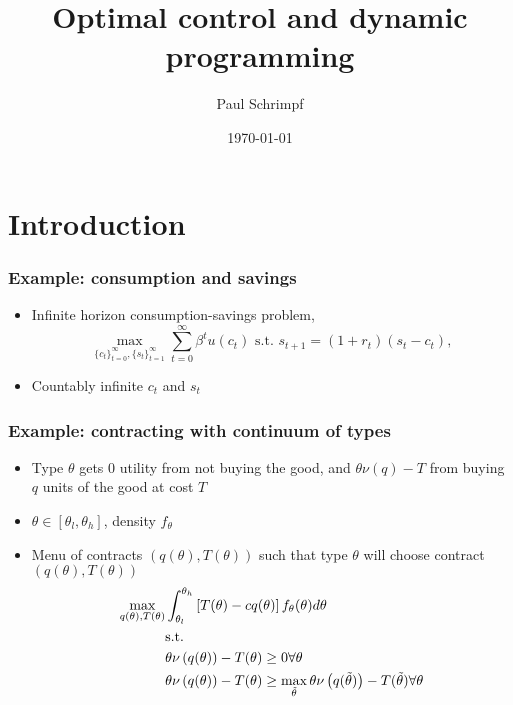 \documentclass[compress]{beamer}
\title{Optimal control and dynamic programming}
\author{Paul Schrimpf}
\institute{UBC \\ Economics 526}
\date{\today}
\begin{document}
\frame{\titlepage}

\begin{frame}
  \tableofcontents  
\end{frame}

\section{Introduction} 

\begin{frame} \frametitle{Example: consumption and savings}
  \begin{itemize}
  \item Infinite horizon consumption-savings problem, 
    \[ \max_{\{c_t\}_{t=0}^\infty,\{s_t\}_{t=1}^\infty} \sum_{t=0}^\infty
    \beta^t u(c_t) \text{ s.t. } s_{t+1} = (1+r_t)(s_t - c_t), \]  
  \item Countably infinite $c_t$ and $s_t$
  \end{itemize} 
\end{frame}

\begin{frame}
  \frametitle{Example: contracting with continuum of types}
  \begin{itemize}
  \item Type $\theta$ gets $0$ utility from not buying the good, and
    $\theta \nu(q) - T$ from buying $q$ units of the good at cost
    $T$
  \item $\theta \in [\theta_l,\theta_h]$, density $f_\theta$
  \item Menu of contracts $(q(\theta),T(\theta))$ such that type $\theta$ will
    choose contract $(q(\theta),T(\theta))$
    \begin{align}
      \max_{q(\theta),T(\theta)} & \int_{\theta_l}^{\theta_h} 
      \left[T(\theta) - cq(\theta)\right]
      f_\theta(\theta) d\theta \notag \\
      & \text{s.t.} \notag \\
      &\theta \nu\left(q(\theta)\right) - T(\theta) \geq 0  \forall
      \theta \label{pc} \\
      &\theta \nu\left(q(\theta)\right) - T(\theta) \geq
      \max_{\tilde{\theta}} \theta \nu\left(q(\tilde{\theta}) \right) -
      T(\tilde{\theta}) \forall \theta \label{ic} 
    \end{align}
  \end{itemize}
\end{frame}
\end{document}
